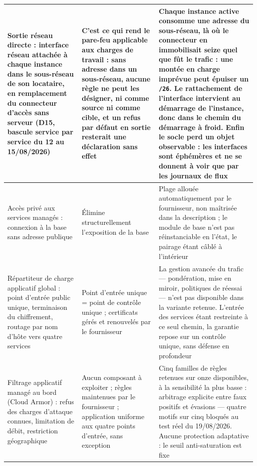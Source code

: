 \begin{longtable}{|P{3.50cm}|P{5.10cm}|P{6.90cm}|}
Sortie réseau directe : interface réseau attachée à chaque instance dans le sous-réseau de son
locataire, en remplacement du connecteur d'accès sans serveur (D15, bascule service par service
du 12 au 15/08/2026) &
C'est ce qui rend le pare-feu applicable aux charges de travail : sans adresse dans un
sous-réseau, aucune règle ne peut les désigner, ni comme source ni comme cible, et un refus par
défaut en sortie resterait une déclaration sans effet &
Chaque instance active consomme une adresse du sous-réseau, là où le connecteur en immobilisait
seize quel que fût le trafic : une montée en charge imprévue peut épuiser un \texttt{/26}. Le
rattachement de l'interface intervient au démarrage de l'instance, donc dans le chemin du
démarrage à froid. Enfin le socle \textbf{perd un objet observable} : les interfaces sont
éphémères et ne se donnent à voir que par les journaux de flux \\ \hline

Accès privé aux services managés : connexion à la base sans adresse publique &
Élimine structurellement l'exposition de la base &
Plage allouée automatiquement par le fournisseur, non maîtrisée dans la description ; le module
de base n'est pas réinstanciable en l'état, le pairage étant câblé à l'intérieur \\ \hline

Répartiteur de charge applicatif global : point d'entrée public unique, terminaison du
chiffrement, routage par nom d'hôte vers quatre services &
Point d'entrée unique = point de contrôle unique ; certificats gérés et renouvelés par le
fournisseur &
La gestion avancée du trafic --- pondération, mise en miroir, politiques de réessai --- n'est pas
disponible dans la variante retenue. L'entrée des services étant restreinte à ce seul chemin, la
garantie repose sur un contrôle unique, sans défense en profondeur \\ \hline

Filtrage applicatif managé au bord (Cloud Armor) : refus des charges d'attaque connues,
limitation de débit, restriction géographique &
Aucun composant à exploiter ; règles maintenues par le fournisseur ; application uniforme aux
quatre points d'entrée, sans exception &
Cinq familles de règles retenues sur onze disponibles, à la sensibilité la plus basse :
arbitrage explicite entre faux positifs et évasions --- quatre motifs sur cinq bloqués au test
réel du 19/08/2026. Aucune protection adaptative : le seuil anti-saturation est fixe \\ \hline


\end{longtable}
